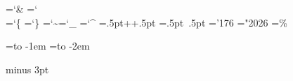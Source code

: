 \chardef\AM=`\& %
\chardef\BS=`\\ %
\chardef\LB=`\{ %
\chardef\RB=`\} %
\def\SP{{\tt\char`\ }} %
\chardef\TL=`\~ %
\chardef\UL=`\_ %
\chardef\CF=`\^ %

\newbox\PPbox %
\setbox\PPbox=\hbox{\kern.5pt\hbox{\sevenrm+\kern-1pt+}\kern.5pt}
\def\PP{\copy\PPbox}
\newbox\MMbox \setbox\MMbox=\hbox{\kern.5pt\hbox{\sevensy{}
 \kern-1pt}\kern.5pt}
\def\MM{\copy\MMbox}
\newbox\MGbox %
\setbox\MGbox=\hbox{\kern-2pt\hbox{\teni\char'176}\kern1pt}
\def\MG{\copy\MGbox}
\def\MRL#1{\mathrel{\let\K==#1}}
\let\GG=\gg
\let\LL=\ll
\let\NULL=\Lambda
\mathchardef\AND="2026 %
\let\OR=\mid %
\let\XOR=\oplus %
\def\CM{{\sim}} %
\newbox\MODbox \setbox\MODbox=\hbox{\eightrm\%}
\def\MOD{\mathbin{\copy\MODbox}}
\def\DC{\kern.1em{::}\kern.1em} %
\def\PA{\mathbin{.*}} %
\def\MGA{\mathbin{\MG*}} %
\def\this{\&{this}}

\newbox\bak \setbox\bak=\hbox to -1em{} %
\newbox\bakk\setbox\bakk=\hbox to -2em{} %

\newcount\ind %
\def\1{\global\advance\ind by1\hangindent\ind em} %
\def\2{\global\advance\ind by-1} %
\def\3#1{\hfil\penalty#10\hfilneg} %
\def\4{\copy\bak} %
\def\5{\hfil\penalty-1\hfilneg\kern2.4em\copy\bakk\ignorespaces}%
\def\6{\ifmmode\else\par %
  \hangindent\ind em\noindent\kern\ind em\copy\bakk\ignorespaces\fi}
\def\7{\Y\6} %
\def\8{\hskip-\ind em\hskip 2em} %

\newcount\gdepth %
\newcount\secpagedepth
{} %
\newtoks\gtitle %
\newskip\intersecskip \intersecskip=12pt minus 3pt %
\let\yskip=\smallskip
\def\?{\mathrel?}
\def\,{\relax\ifmmode\mskip\thinmuskip\else\thinspace\fi}


